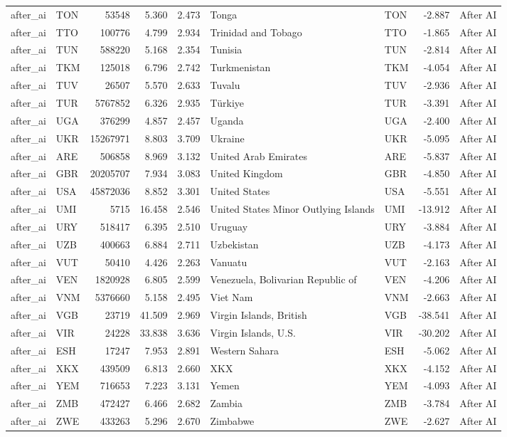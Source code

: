 \begin{tabular}{llrrrllrl}
after\_ai & TON & 53548 & 5.360 & 2.473 & Tonga & TON & -2.887 & After AI \\
after\_ai & TTO & 100776 & 4.799 & 2.934 & Trinidad and Tobago & TTO & -1.865 & After AI \\
after\_ai & TUN & 588220 & 5.168 & 2.354 & Tunisia & TUN & -2.814 & After AI \\
after\_ai & TKM & 125018 & 6.796 & 2.742 & Turkmenistan & TKM & -4.054 & After AI \\
after\_ai & TUV & 26507 & 5.570 & 2.633 & Tuvalu & TUV & -2.936 & After AI \\
after\_ai & TUR & 5767852 & 6.326 & 2.935 & Türkiye & TUR & -3.391 & After AI \\
after\_ai & UGA & 376299 & 4.857 & 2.457 & Uganda & UGA & -2.400 & After AI \\
after\_ai & UKR & 15267971 & 8.803 & 3.709 & Ukraine & UKR & -5.095 & After AI \\
after\_ai & ARE & 506858 & 8.969 & 3.132 & United Arab Emirates & ARE & -5.837 & After AI \\
after\_ai & GBR & 20205707 & 7.934 & 3.083 & United Kingdom & GBR & -4.850 & After AI \\
after\_ai & USA & 45872036 & 8.852 & 3.301 & United States & USA & -5.551 & After AI \\
after\_ai & UMI & 5715 & 16.458 & 2.546 & United States Minor Outlying Islands & UMI & -13.912 & After AI \\
after\_ai & URY & 518417 & 6.395 & 2.510 & Uruguay & URY & -3.884 & After AI \\
after\_ai & UZB & 400663 & 6.884 & 2.711 & Uzbekistan & UZB & -4.173 & After AI \\
after\_ai & VUT & 50410 & 4.426 & 2.263 & Vanuatu & VUT & -2.163 & After AI \\
after\_ai & VEN & 1820928 & 6.805 & 2.599 & Venezuela, Bolivarian Republic of & VEN & -4.206 & After AI \\
after\_ai & VNM & 5376660 & 5.158 & 2.495 & Viet Nam & VNM & -2.663 & After AI \\
after\_ai & VGB & 23719 & 41.509 & 2.969 & Virgin Islands, British & VGB & -38.541 & After AI \\
after\_ai & VIR & 24228 & 33.838 & 3.636 & Virgin Islands, U.S. & VIR & -30.202 & After AI \\
after\_ai & ESH & 17247 & 7.953 & 2.891 & Western Sahara & ESH & -5.062 & After AI \\
after\_ai & XKX & 439509 & 6.813 & 2.660 & XKX & XKX & -4.152 & After AI \\
after\_ai & YEM & 716653 & 7.223 & 3.131 & Yemen & YEM & -4.093 & After AI \\
after\_ai & ZMB & 472427 & 6.466 & 2.682 & Zambia & ZMB & -3.784 & After AI \\
after\_ai & ZWE & 433263 & 5.296 & 2.670 & Zimbabwe & ZWE & -2.627 & After AI \\
\bottomrule
\end{tabular}
